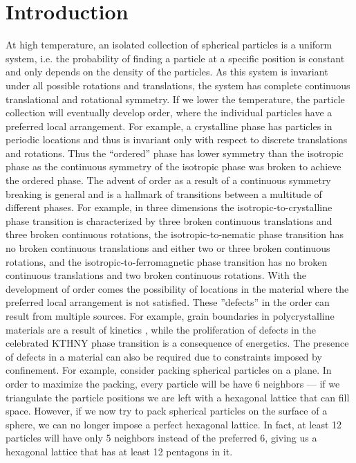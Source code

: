 \chapter{Introduction}
At high temperature, an isolated collection of spherical particles is a uniform system, i.e. the probability of finding a particle at a specific position is constant and only depends on the density of the particles.
As this system is invariant under all possible rotations and translations, the system has complete continuous translational and rotational symmetry.
If we lower the temperature, the particle collection will eventually develop order, where the individual particles have a preferred local arrangement.
For example, a crystalline phase has particles in periodic locations and thus is invariant only with respect to discrete translations and rotations.
Thus the ``ordered'' phase has lower symmetry than the isotropic phase as the continuous symmetry of the isotropic phase was broken to achieve the ordered phase.
The advent of order as a result of a continuous symmetry breaking is general and is a hallmark of transitions between a multitude of different phases. For example, in three dimensions the isotropic-to-crystalline phase transition is characterized by three broken continuous translations and three broken continuous rotations, the isotropic-to-nematic phase transition has no broken continuous translations and either two or three broken continuous rotations, and the isotropic-to-ferromagnetic phase transition has no broken continuous translations and two broken continuous rotations.
With the development of order comes the possibility of locations in the material where the preferred local arrangement is not satisfied.
These ''defects'' in the order can result from multiple sources.
For example, grain boundaries in polycrystalline materials are a result of kinetics , while the proliferation of defects in the celebrated KTHNY phase transition is a consequence of energetics.
The presence of defects in a material can also be required due to constraints imposed by confinement.
For example, consider packing spherical particles on a plane.
In order to maximize the packing, every particle will be have 6 neighbors --- if we triangulate the particle positions we are left with a hexagonal lattice that can fill space.
However, if we now try to pack spherical particles on the surface of a sphere, we can no longer impose a perfect hexagonal lattice.
In fact, at least 12 particles will have only 5 neighbors instead of the preferred 6, giving us a hexagonal lattice that has at least 12 pentagons in it.
